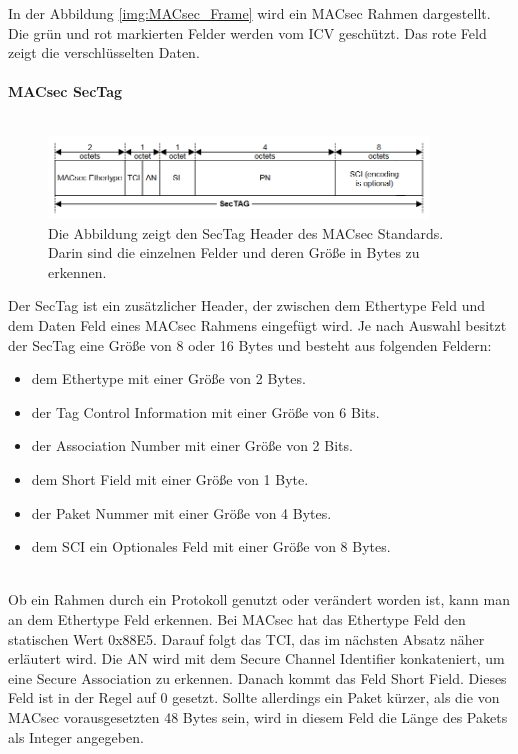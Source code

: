In der Abbildung \ref{img:MACsec_Frame} wird ein MACsec Rahmen dargestellt. Die grün und rot markierten Felder werden vom ICV geschützt. Das rote Feld zeigt die verschlüsselten Daten.
\\
\\
\textbf{MACsec SecTag}
\\
\\
\begin{figure}
	
	\centering \includegraphics[width=0.9\textwidth]{images/SecTag_Format.PNG}
	\caption[SecTag Header vom MACsec Standard]{Die Abbildung zeigt den SecTag Header des MACsec Standards. Darin sind die einzelnen Felder und deren Größe in Bytes zu erkennen.}
	\label{img:SecTag}
\end{figure}Der SecTag ist ein zusätzlicher Header, der zwischen dem Ethertype Feld und dem Daten Feld eines \gls{MACsec} Rahmens eingefügt wird. Je nach Auswahl besitzt der SecTag eine Größe von 8 oder 16 Bytes und besteht aus folgenden Feldern: 
\begin{itemize}
\item dem Ethertype mit einer Größe von 2 Bytes.
\item der Tag Control Information mit einer Größe von 6 Bits.
\item der Association Number mit einer Größe von 2 Bits.
\item dem Short Field mit einer Größe von 1 Byte.
\item der Paket Nummer mit einer Größe von 4 Bytes.
\item dem SCI ein Optionales Feld mit einer Größe von 8 Bytes.
\end{itemize} \\
Ob ein Rahmen durch ein Protokoll genutzt oder verändert worden ist, kann man an dem Ethertype Feld erkennen. Bei MACsec hat das Ethertype Feld den statischen Wert 0x88E5. Darauf folgt das \gls{TCI}, das im nächsten Absatz näher erläutert wird. 
Die \gls{AN} wird mit dem Secure Channel Identifier konkateniert, um eine Secure Association zu erkennen. 
Danach kommt das Feld Short Field. Dieses Feld ist in der Regel auf 0 gesetzt. Sollte allerdings ein Paket kürzer, als die von \gls{MACsec} vorausgesetzten 48 Bytes sein, wird in diesem Feld die Länge des Pakets als Integer angegeben. 
